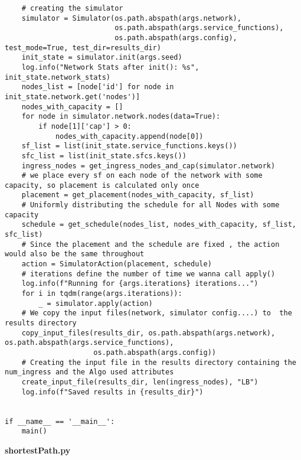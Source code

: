 \begin{lstlisting}
    # creating the simulator
    simulator = Simulator(os.path.abspath(args.network),
                          os.path.abspath(args.service_functions),
                          os.path.abspath(args.config), test_mode=True, test_dir=results_dir)
    init_state = simulator.init(args.seed)
    log.info("Network Stats after init(): %s", init_state.network_stats)
    nodes_list = [node['id'] for node in init_state.network.get('nodes')]
    nodes_with_capacity = []
    for node in simulator.network.nodes(data=True):
        if node[1]['cap'] > 0:
            nodes_with_capacity.append(node[0])
    sf_list = list(init_state.service_functions.keys())
    sfc_list = list(init_state.sfcs.keys())
    ingress_nodes = get_ingress_nodes_and_cap(simulator.network)
    # we place every sf on each node of the network with some capacity, so placement is calculated only once
    placement = get_placement(nodes_with_capacity, sf_list)
    # Uniformly distributing the schedule for all Nodes with some capacity
    schedule = get_schedule(nodes_list, nodes_with_capacity, sf_list, sfc_list)
    # Since the placement and the schedule are fixed , the action would also be the same throughout
    action = SimulatorAction(placement, schedule)
    # iterations define the number of time we wanna call apply()
    log.info(f"Running for {args.iterations} iterations...")
    for i in tqdm(range(args.iterations)):
        _ = simulator.apply(action)
    # We copy the input files(network, simulator config....) to  the results directory
    copy_input_files(results_dir, os.path.abspath(args.network), os.path.abspath(args.service_functions),
                     os.path.abspath(args.config))
    # Creating the input file in the results directory containing the num_ingress and the Algo used attributes
    create_input_file(results_dir, len(ingress_nodes), "LB")
    log.info(f"Saved results in {results_dir}")


if __name__ == '__main__':
    main()
\end{lstlisting}

\newpage

\textbf{shortestPath.py}

